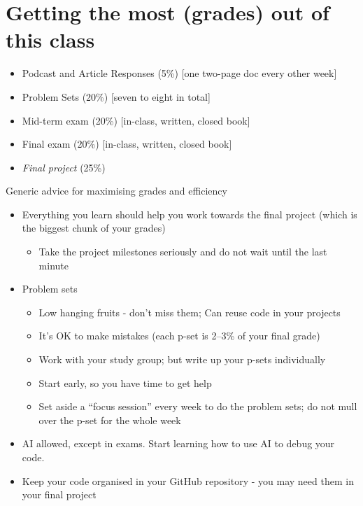 \documentclass[
  11pt,
  letterpaper]{article}
\providecommand{\tightlist}{%
  \setlength{\itemsep}{0pt}\setlength{\parskip}{0pt}}
\begin{document}
\section{Getting the most (grades) out of this
class}\label{getting-the-most-grades-out-of-this-class}

\begin{itemize}
\tightlist
\item
  Podcast and Article Responses (5\%) {[}one two-page doc every other
  week{]}
\item
  Problem Sets (20\%) {[}seven to eight in total{]}
\item
  Mid-term exam (20\%) {[}in-class, written, closed book{]}
\item
  Final exam (20\%) {[}in-class, written, closed book{]}
\item
  \emph{Final project} (25\%)
\end{itemize}

\newpage

Generic advice for maximising grades and efficiency

\begin{itemize}
\tightlist
\item
  Everything you learn should help you work towards the final project
  (which is the biggest chunk of your grades)

  \begin{itemize}
  \tightlist
  \item
    Take the project milestones seriously and do not wait until the last
    minute
  \end{itemize}
\item
  Problem sets

  \begin{itemize}
  \tightlist
  \item
    Low hanging fruits - don't miss them; Can reuse code in your
    projects
  \item
    It's OK to make mistakes (each p-set is 2--3\% of your final grade)
  \item
    Work with your study group; but write up your p-sets individually
  \item
    Start early, so you have time to get help
  \item
    Set aside a ``focus session'' every week to do the problem sets; do
    not mull over the p-set for the whole week
  \end{itemize}
\item
  AI allowed, except in exams. Start learning how to use AI to debug
  your code.
\item
  Keep your code organised in your GitHub repository - you may need them
  in your final project
\end{itemize}
\end{document}
